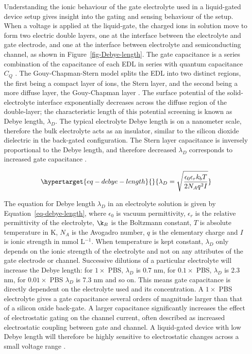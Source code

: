 \documentclass[
  a4paper,
]{scrbook}
\begin{document}
Understanding the ionic behaviour of the gate electrolyte used in a
liquid-gated device setup gives insight into the gating and sensing
behaviour of the setup. When a voltage is applied at the liquid-gate,
the charged ions in solution move to form two electric double layers,
one at the interface between the electrolyte and gate electrode, and one
at the interface between electrolyte and semiconducting channel, as
shown in Figure~\ref{fig-Debye-length}. The gate capacitance is a series
combination of the capacitance of each EDL in series with quantum
capacitance \(C_{Q}\) \autocite{Heller2010,Shkodra2021}. The
Gouy-Chapman-Stern model splits the EDL into two distinct regions, the
first being a compact layer of ions, the Stern layer, and the second
being a more diffuse layer, the Gouy-Chapman layer
\autocite{Tiwari2022}. The surface potential of the solid-electrolyte
interface exponentially decreases across the diffuse region of the
double-layer; the characteristic length of this potential screening is
known as Debye length, \(\lambda_D\). The typical electrolyte Debye
length is on a nanometer scale, therefore the bulk electrolyte acts as
an insulator, similar to the silicon dioxide dielectric in the
back-gated configuration. The Stern layer capacitance is inversely
proportional to the Debye length, and therefore decreased \(\lambda_D\)
corresponds to increased gate capacitance
\autocite{Heller2010,Ohno2015,Shkodra2021,Yao2021}.

\begin{equation}\protect\hypertarget{eq-debye-length}{}{
\lambda_D = \sqrt{\frac{\epsilon_0\epsilon_rk_bT}{2N_Aq^2I}}
}\label{eq-debye-length}\end{equation}

The equation for Debye length \(\lambda_D\) in an electrolyte solution
is given by Equation~\ref{eq-debye-length}, where \(\epsilon_0\) is
vacuum permittivity, \(\epsilon_r\) is the relative permittivity of the
electrolyte, \(\k_B\) is the Boltzmann constant, \(T\) is absolute
temperature in K, \(N_A\) is the Avogadro number, \(q\) is the
elementary charge and \(I\) is ionic strength in mmol L\(^{-1}\). When
temperature is kept constant, \(\lambda_D\) only depends on the ionic
strength of the electrolyte and not on any attributes of the gate
electrode or channel. Successive dilutions of a particular electrolyte
will increase the Debye length: for \(1 \times\) PBS, \(\lambda_D\) is
0.7 nm, for \(0.1 \times\) PBS, \(\lambda_D\) is 2.3 nm, for
\(0.01 \times\) PBS \(\lambda_D\) is 7.3 nm and so on. This means gate
capacitance is directly dependent on the electrolyte used and its
concentration. A \(1 \times\) PBS electrolyte gives a gate capacitance
several orders of magnitude larger than that of a silicon oxide
back-gate. A larger capacitance significantly increases the effect of
electrostatic gating on the channel current, often described as
increased electrostatic coupling between gate and channel. A
liquid-gated device with low Debye length will therefore be highly
sensitive to electrostatic changes across a small voltage range
\autocite{Heller2010,Wang2010,Ohno2015,Shkodra2021,Yao2021}.
\end{document}

